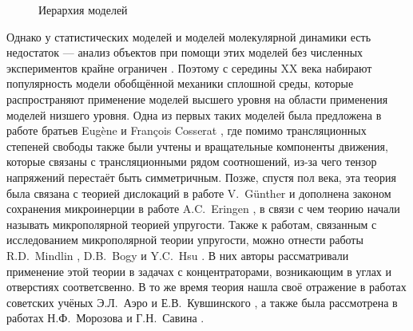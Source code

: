 \ifsynopsis
\else
\begin{figure}[ht]
    \caption{Иерархия моделей}\label{fig:ModelsHierarchy}
\end{figure}
\fi

\ifsynopsis
\else
Однако у статистических моделей и моделей молекулярной динамики есть недостаток --- анализ объектов при помощи этих моделей без численных экспериментов крайне ограничен \cite{MDExperiment}. Поэтому с середины XX века набирают популярность модели обобщённой механики сплошной среды, которые распространяют применение моделей высшего уровня на области применения моделей низшего уровня. Одна из первых таких моделей была предложена в работе братьев Eugène и François Cosserat \cite{Cosserat}, где помимо трансляционных степеней свободы также были учтены и вращательные компоненты движения, которые связаны с трансляционными рядом соотношений, из-за чего тензор напряжений перестаёт быть симметричным. Позже, спустя пол века, эта теория была связана с теорией дислокаций в работе V.~G{\"u}nther \cite{CosseratAndDislocation} и дополнена законом сохранения микроинерции в работе A.C.~Eringen \cite{Eringen2, Eringen3}, в связи с чем теорию начали называть микрополярной теорией упругости. Также к работам, связанным с исследованием микрополярной теории упругости, можно отнести работы R.D.~Mindlin \cite{Mindlin1, Mindlin2, Mindlin3}, D.B.~Bogy \cite{Bogy} и Y.C.~Hsu \cite{Hsu}. В них авторы рассматривали применение этой теории в задачах с концентраторами, возникающим в углах и отверстиях соответсвенно. В то же время теория нашла своё отражение в работах советских учёных Э.Л.~Аэро и Е.В.~Кувшинского \cite{Aero1,Aero2}, а также была рассмотрена в работах Н.Ф.~Морозова \cite{Morozov} и Г.Н.~Савина \cite{Savin}.
\fi

